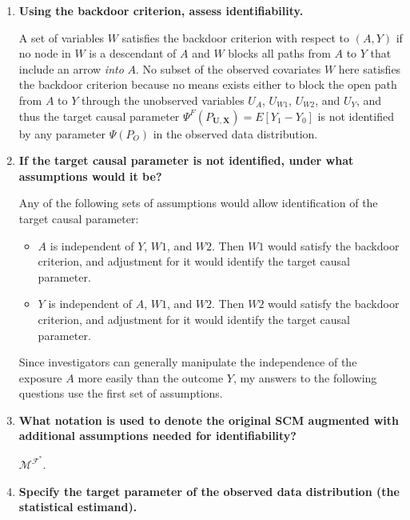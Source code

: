 \documentclass{article}\usepackage[]{graphicx}\usepackage[]{xcolor}
\begin{document}
  \begin{enumerate}[label=\textbf{\alph*.}]
  
    \item \textbf{Using the backdoor criterion, assess identifiability.}
    
    A set of variables $W$ satisfies the backdoor criterion with respect to $(A, Y)$ if no node in $W$ is a descendant of $A$ and $W$ blocks all paths from $A$ to $Y$ that include an arrow \textit{into} $A$. No subset of the observed covariates $W$ here satisfies the backdoor criterion because no means exists either to block the open path from $A$ to $Y$ through the unobserved variables $U_A$, $U_{W1}$, $U_{W2}$, and $U_Y$, and thus the target causal parameter $\Psi^F(P_{\bm{U},\bm{X}}) = E[Y_1 - Y_0]$ is not identified by any parameter $\Psi(P_O)$ in the observed data distribution.
    
    \item \textbf{If the target causal parameter is not identified, under what assumptions would it be?}
    
    Any of the following sets of assumptions would allow identification of the target causal parameter:
    
    \begin{itemize}
    
      \item $A$ is independent of $Y$, $W1$, and $W2$. Then $W1$ would satisfy the backdoor criterion, and adjustment for it would identify the target causal parameter. 
      
      \item $Y$ is independent of $A$, $W1$, and $W2$. Then $W2$ would satisfy the backdoor criterion, and adjustment for it would identify the target causal parameter. 
    
    \end{itemize}
    
  Since investigators can generally manipulate the independence of the exposure $A$ more easily than the outcome $Y$, my answers to the following questions use the first set of assumptions.
    
    \item \textbf{What notation is used to denote the original SCM augmented with additional assumptions needed for identifiability?}
    
    $\mathcal{M}^{\mathcal{F}^*}$.
    
    \item \textbf{Specify the target parameter of the observed data distribution (the statistical estimand).}
    

\end{enumerate}
\end{document}
